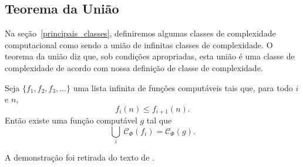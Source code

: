 \subsection{Teorema da União}

Na seção~\ref{principais_classes},
definiremos algumas classes de complexidade computacional
como sendo a união de infinitas classes de complexidade.
O teorema da união diz que,
sob condições apropriadas,
esta união é uma classe de complexidade
de acordo com nossa definição de classe de complexidade.

\begin{theorem}
    \label{teorema_da_uniao}
    Seja $\{f_1, f_2, f_3, \dots\}$ uma lista infinita de funções computáveis
    tais que, para todo $i$ e $n$,
    \begin{equation*}
        f_i(n) \leq f_{i+1}(n).
    \end{equation*}
    Então existe uma função computável $g$
    tal que
    \begin{equation*}
        \bigcup_i \ \mathcal C_\Phi(f_i) = \mathcal C_\Phi(g).
    \end{equation*}
\end{theorem}

A demonstração foi retirada do texto de .


